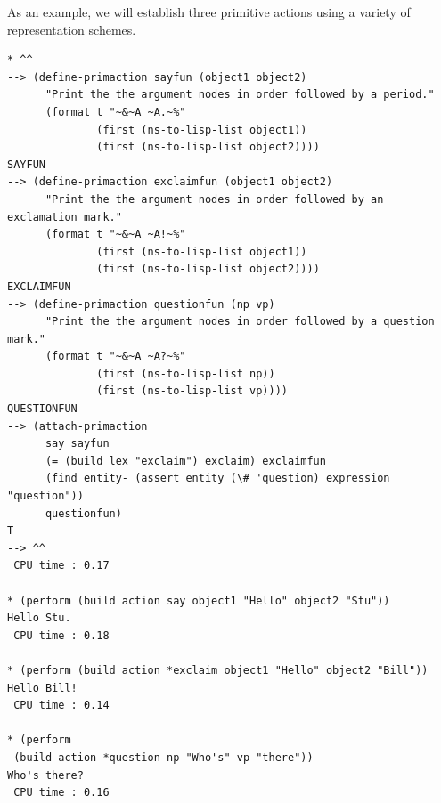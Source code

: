 \documentclass{book}
\begin{document}
As an example, we will establish three primitive actions using a
variety of representation schemes.
\begin{verbatim}
* ^^
--> (define-primaction sayfun (object1 object2)
      "Print the the argument nodes in order followed by a period."
      (format t "~&~A ~A.~%"
              (first (ns-to-lisp-list object1))
              (first (ns-to-lisp-list object2))))
SAYFUN
--> (define-primaction exclaimfun (object1 object2)
      "Print the the argument nodes in order followed by an exclamation mark."
      (format t "~&~A ~A!~%"
              (first (ns-to-lisp-list object1))
              (first (ns-to-lisp-list object2))))
EXCLAIMFUN
--> (define-primaction questionfun (np vp)
      "Print the the argument nodes in order followed by a question mark."
      (format t "~&~A ~A?~%"
              (first (ns-to-lisp-list np))
              (first (ns-to-lisp-list vp))))
QUESTIONFUN
--> (attach-primaction
      say sayfun
      (= (build lex "exclaim") exclaim) exclaimfun
      (find entity- (assert entity (\# 'question) expression "question"))
      questionfun)
T
--> ^^
 CPU time : 0.17 

* (perform (build action say object1 "Hello" object2 "Stu"))
Hello Stu.
 CPU time : 0.18 

* (perform (build action *exclaim object1 "Hello" object2 "Bill"))
Hello Bill!
 CPU time : 0.14 

* (perform
 (build action *question np "Who's" vp "there"))
Who's there?
 CPU time : 0.16 
\end{verbatim}
\end{document}
